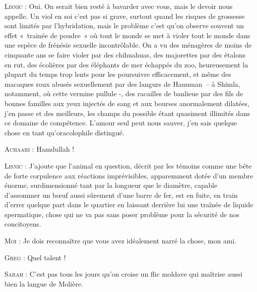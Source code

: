 \begin{dialogue}
\textsc{Lisnic} : Oui. On serait bien resté à bavarder avec vous, mais le devoir nous appelle. Un viol en soi c’est pas si grave, surtout quand les risques de grossesse sont limités par l’hybridation, mais le problème c’est qu’on observe souvent un effet «~trainée de poudre~» où tout le monde se met à violer tout le monde dans une espèce de frénésie sexuelle incontrôlable. On a vu des ménagères de moins de cinquante ans se faire violer par des chihuahuas, des majorettes par des étalons en rut, des écolières par des éléphants de mer échappés du zoo, heureusement la plupart du temps trop lents pour les poursuivre efficacement, et même des macaques roux abusés sexuellement par des langurs de Hanuman~-- à Shimla, notamment, où cette vermine pullule -, des racailles de banlieue par des fils de bonnes familles aux yeux injectés de sang et aux bourses anormalement dilatées, j’en passe et des meilleurs, les champs du possible étant quasiment illimités dans ce domaine de compétence. L’amour seul peut nous sauver, j’en sais quelque chose en tant qu’oracolophile distingué.

\textsc{Achaari} : Hamdullah !

\textsc{Lisnic} : J’ajoute que l’animal en question, décrit par les témoins comme une bête de forte corpulence aux réactions imprévisibles, apparemment dotée d’un membre énorme, surdimensionné tant par la longueur que le diamètre, capable d’assommer un bœuf aussi sûrement d’une barre de fer, est en fuite, en train d’errer quelque part dans le quartier en laissant derrière lui une traînée de liquide spermatique, chose qui ne va pas sans poser problème pour la sécurité de nos concitoyens.

%
%
%
\textsc{Moi} : Je dois reconnaître que vous avez idéalement narré la chose, mon ami.

\textsc{Greg} : Quel talent !

\textsc{Sarah} : C’est pas tous les jours qu’on croise un flic moldave qui maîtrise aussi bien la langue de Molière.


\end{dialogue}
